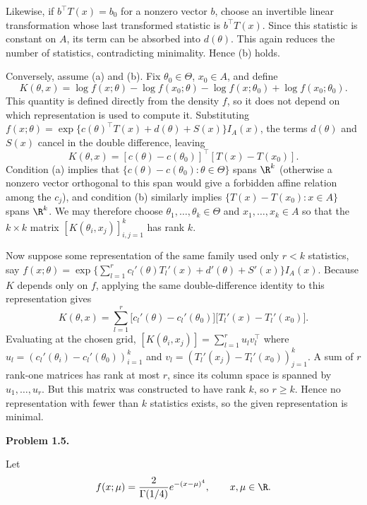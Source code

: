 \documentclass[answers,12pt,addpoints]{exam}
\begin{document}
\begin{questions}
\begin{solution}
Likewise, if $b^\top T(x)=b_0$ for a nonzero vector $b$, choose an invertible linear
transformation whose last transformed statistic is $b^\top T(x)$. Since this
statistic is constant on $A$, its term can be absorbed into $d(\theta)$. This again
reduces the number of statistics, contradicting minimality. Hence (b) holds.

Conversely, assume (a) and (b). Fix $\theta_0\in\Theta$, $x_0\in A$, and define
\[
K(\theta,x)
=\log f(x;\theta)-\log f(x_0;\theta)-\log f(x;\theta_0)+\log f(x_0;\theta_0).
\]
This quantity is defined directly from the density $f$, so it does not depend
on which representation is used to compute it. Substituting
$f(x;\theta)=\exp\{c(\theta)^\top T(x)+d(\theta)+S(x)\}I_A(x)$, the terms
$d(\theta)$ and $S(x)$ cancel in the double difference, leaving
\[
K(\theta,x)=[c(\theta)-c(\theta_0)]^\top[T(x)-T(x_0)].
\]
Condition (a) implies that $\{c(\theta)-c(\theta_0):\theta\in\Theta\}$ spans
$\R^k$ (otherwise a nonzero vector orthogonal to this span would give a
forbidden affine relation among the $c_j$), and condition (b) similarly
implies $\{T(x)-T(x_0):x\in A\}$ spans $\R^k$. We may therefore choose
$\theta_1,\ldots,\theta_k\in\Theta$ and $x_1,\ldots,x_k\in A$ so that the
$k\times k$ matrix $[K(\theta_i,x_j)]_{i,j=1}^k$ has rank $k$.

Now suppose some representation of the same family used only $r<k$
statistics, say
$f(x;\theta)=\exp\{\sum_{l=1}^r c_l'(\theta)T_l'(x)+d'(\theta)+S'(x)\}I_A(x)$.
Because $K$ depends only on $f$, applying the same double-difference
identity to this representation gives
\[
K(\theta,x)=\sum_{l=1}^r\bigl[c_l'(\theta)-c_l'(\theta_0)\bigr]
\bigl[T_l'(x)-T_l'(x_0)\bigr].
\]
Evaluating at the chosen grid, $[K(\theta_i,x_j)]=\sum_{l=1}^ru_lv_l^\top$
where $u_l=(c_l'(\theta_i)-c_l'(\theta_0))_{i=1}^k$ and
$v_l=(T_l'(x_j)-T_l'(x_0))_{j=1}^k$. A sum of $r$ rank-one matrices has rank
at most $r$, since its column space is spanned by $u_1,\ldots,u_r$. But this
matrix was constructed to have rank $k$, so $r\ge k$. Hence no representation
with fewer than $k$ statistics exists, so the given representation is minimal.
\end{solution}

\question[0] \textbf{Problem 1.5.}

Let
\[
f(x;\mu)=
\frac{2}{\Gamma(1/4)}e^{-(x-\mu)^4},
\qquad
x,\mu\in\R.
\]
\end{questions}
\end{document}

